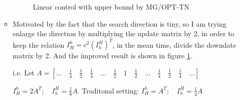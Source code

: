 \documentclass[10pt]{article}
\begin{document}
\begin{itemize}
\begin{itemize}
\begin{figure}[h]
  \caption{Linear control with upper bound by MG/OPT-TN }
\label{fig:good287}
\end{figure}

\item Motivated by the fact that the search direction is tiny, so I am trying enlarge the direction by multiplying the update matrix by 2, in order to keep the relation $I_H^h=c^2 (I_h^H)^{T}$, in the mean time, divide the downdate matrix by 2. And the improved result is shown in figure \ref{fig:good287}.\

i.e. Let $A=\left [ \dots \quad \frac{1}{4} \quad \frac{1}{2} \quad \frac{1}{4} \quad \dots \quad \frac{1}{2} \quad 1 \quad \frac{1}{2} \quad \dots \quad \frac{1}{4} \quad \frac{1}{2} \quad \frac{1}{4} \quad \dots \right ]$\

$I_H^h= 2A^T;  \quad I_h^H= \frac{1}{8}A$. Traditonal setting: $I_H^h= A^T;  \quad I_h^H= \frac{1}{4}A$


\end{itemize}
\end{itemize}
\end{document}
